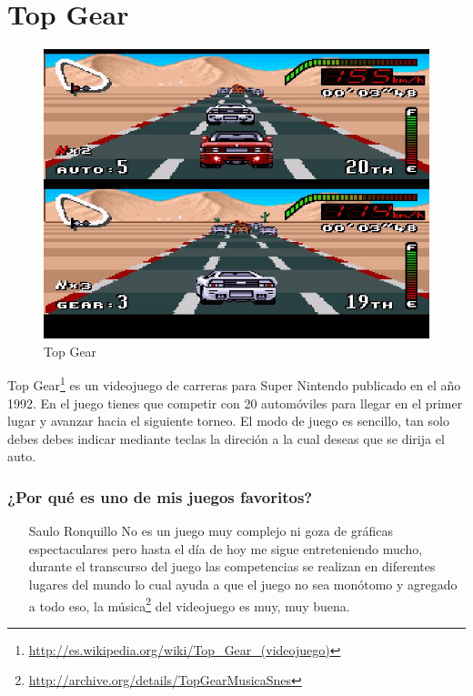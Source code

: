 \section{Top Gear}
\begin{figure}[htbp]
\begin{center}
\includegraphics[width=.60\textwidth]{./imagenes/top_gear.jpg}
\caption{Top Gear}
\label{Top Gear}
\end{center}
\end{figure}
Top Gear\footnote{\url{http://es.wikipedia.org/wiki/Top_Gear_(videojuego)}} es un videojuego de carreras para Super Nintendo publicado en el año 1992. En el juego tienes que competir con 20 automóviles para llegar en el primer lugar y avanzar hacia el siguiente torneo. El modo de juego es sencillo, tan solo debes debes indicar mediante teclas la direción a la cual deseas que se dirija el auto.

\subsubsection{¿Por qué es uno de mis juegos favoritos?}
\begin{itemize}
	\item[Saulo Ronquillo]No es un juego muy complejo ni goza de gráficas espectaculares pero hasta el día de hoy me sigue entreteniendo mucho, durante el transcurso del juego las competencias se realizan en diferentes lugares del mundo lo cual ayuda a que el juego no sea monótomo y agregado a todo eso, la música\footnote{\url{http://archive.org/details/TopGearMusicaSnes}} del videojuego es muy, muy buena.
\end{itemize}
